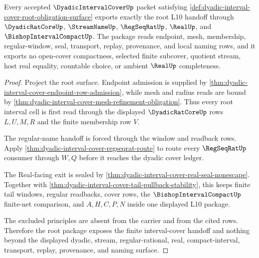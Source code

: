 \begin{theorem}
\label{thm:dyadic-interval-cover-root-unblock-package}
Every accepted $\DyadicIntervalCoverUp$ packet satisfying \autoref{def:dyadic-interval-cover-root-obligation-surface} exports exactly the root L10 handoff through $\DyadicRatCoreUp$, $\StreamNameUp$, $\RegSeqRatUp$, $\RealUp$, and $\BishopIntervalCompactUp$. The package reads endpoint, mesh, membership, regular-window, seal, transport, replay, provenance, and local naming rows, and it exports no open-cover compactness, selected finite subcover, quotient stream, host real equality, countable choice, or ambient $\RealUp$ completeness.
\end{theorem}
\begin{proof}
Project the root surface. Endpoint admission is supplied by \autoref{thm:dyadic-interval-cover-endpoint-row-admission}, while mesh and radius reads are bound by \autoref{thm:dyadic-interval-cover-mesh-refinement-obligation}. Thus every root interval cell is first read through the displayed $\DyadicRatCoreUp$ rows $L,U,M,R$ and the finite membership row $V$.

The regular-name handoff is forced through the window and readback rows. Apply \autoref{thm:dyadic-interval-cover-regseqrat-route} to route every $\RegSeqRatUp$ consumer through $W,Q$ before it reaches the dyadic cover ledger.

The Real-facing exit is sealed by \autoref{thm:dyadic-interval-cover-real-seal-nonescape}. Together with \autoref{thm:dyadic-interval-cover-tail-pullback-stability}, this keeps finite tail windows, regular readbacks, cover rows, the $\BishopIntervalCompactUp$ finite-net comparison, and $A,H,C,P,N$ inside one displayed L10 package.

The excluded principles are absent from the carrier and from the cited rows. Therefore the root package exposes the finite interval-cover handoff and nothing beyond the displayed dyadic, stream, regular-rational, real, compact-interval, transport, replay, provenance, and naming surface.
\end{proof}

